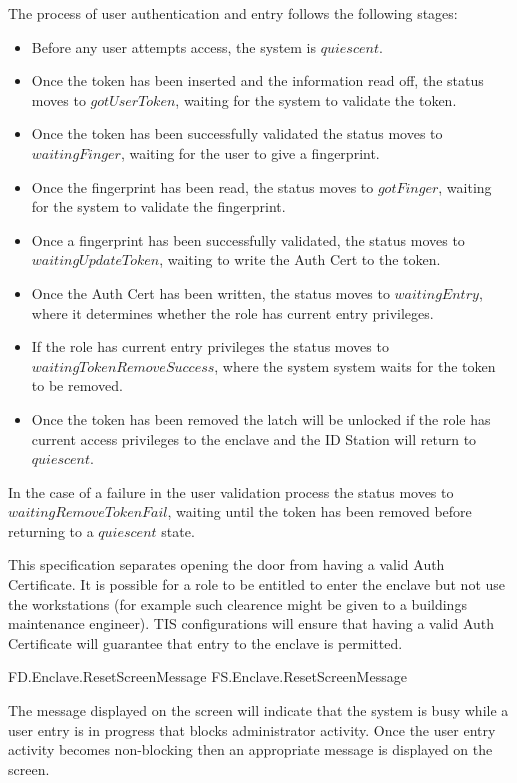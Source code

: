 The process of user authentication and entry follows the following
stages:

\begin{itemize}
\item

Before any user attempts access, the system is $quiescent$.
\item
Once the token has been inserted and the information read off,
the status moves to $gotUserToken$, waiting for the system to validate
the token. 
\item
Once the token has been successfully validated the 
status moves to $waitingFinger$,
waiting for the user to give a fingerprint.
\item
Once the fingerprint has been read, the status moves to $gotFinger$,
waiting for the system to validate the fingerprint.
\item
Once a fingerprint has been successfully validated,
the status moves to $waitingUpdateToken$,
waiting to write the Auth Cert to the token.
\item
Once the Auth Cert has been written, the status moves to
$waitingEntry$, where it determines whether the role has
current entry privileges.
\item
If the role has current entry privileges the status moves to
$waitingTokenRemoveSuccess$, where the system system waits for 
the token to be removed.
\item
Once the token has been removed
the latch will be unlocked if the role has current access privileges
to the enclave and the ID Station will return to $quiescent$.
\end{itemize}
In the case of a failure in the user validation process the status
moves to  $waitingRemoveTokenFail$, waiting until the token has been removed before returning to a
$quiescent$ state.

This specification separates opening the door from having a valid Auth
Certificate. It is possible for a role to be entitled to enter the
enclave but not use the workstations (for example such clearence might
be given to a buildings maintenance engineer). TIS
configurations will ensure that having a valid Auth Certificate will
guarantee that entry to the enclave is permitted. 

\begin{traceunit}{FD.Enclave.ResetScreenMessage}
{FS.Enclave.ResetScreenMessage}
\end{traceunit}

The message displayed on the screen will indicate that the
system is busy while a user entry is in progress that blocks
administrator activity. Once the user entry activity becomes
non-blocking then an appropriate message is displayed on the screen.

